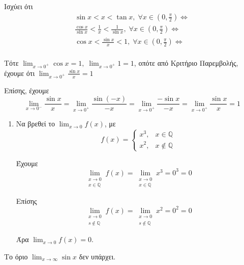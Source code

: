 \begin{prop}
  Ισχύει ότι 
  \begin{align*}
    \sin{x} < x < \tan{x}, \; \forall x \in \left(0, \frac{\pi}{2}\right) 
    \Leftrightarrow \\
    \frac{\cos{x}}{\sin{x}} < \frac{1}{x} < \frac{1}{\sin{x}}, \; \forall x \in 
    \left(0, \frac{\pi}{2}\right) \Leftrightarrow \\
    \cos{x} < \frac{\sin{x}}{x} < 1, \; \forall x \in \left(0, \frac{\pi}{2}\right) 
    \Leftrightarrow \\
  \end{align*} 

  Τότε $ \lim_{x \to 0^{+}} \cos{x} = 1, \; \lim_{x \to 0^{+}} 1 = 1 $, 
  οπότε από Κριτήριο Παρεμβολής, έχουμε ότι 
  $ \lim_{x \to 0^{+}} \frac{\sin{x}}{x} = 1$

  Επίσης, έχουμε
  \[
    \lim_{x \to 0^{-}} \frac{\sin{x}}{x} = \lim_{x \to 0^{+}} 
    \frac{\sin{(-x)}}{-x} = \lim_{x \to 0^{+}} \frac{- \sin{x}}{-x} = 
    \lim_{x \to 0^{+}} \frac{\sin{x}}{x} = 1 
  \] 
\end{prop}

\begin{examples}
\item {}
  \begin{enumerate}
    \item Να βρεθεί το $ \lim_{x \to 0} f(x) $, με 
      \[
        f(x) = 
        \begin{cases} 
          x^{3}, & x \in \mathbb{Q} \\
          x^{2}, & x\not \in \mathbb{Q} 
        \end{cases} 
      \] 

      Έχουμε 
      \[
        \lim_{\substack{x \to 0 \\ x \in \mathbb{Q}}} f(x) = 
        \lim_{\substack{x \to 0 \\ x \in \mathbb{Q}}} x^{3} = 0^{3} = 0 
      \] 

      Επίσης
      \[
        \lim_{\substack{x \to 0 \\ s \not \in \mathbb{Q}}} f(x) =  
        \lim_{\substack{x \to 0 \\ s \not \in \mathbb{Q}}} x^{2} = 0^{2} = 0
      \] 

      Άρα $ \lim_{x \to 0} f(x) = 0 $.

  \end{enumerate}
\end{examples}

\begin{prop}
  Το όριο $ \lim_{x \to \infty} \sin{x} $ δεν υπάρχει.
\end{prop}

